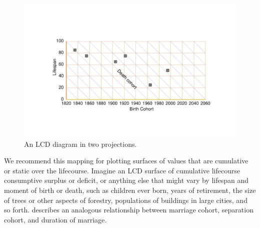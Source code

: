 \documentclass[12pt,oneside,a4paper]{article} %
\begin{document}
\begin{figure}[h!] 
\caption{An LCD diagram in two projections.}
\label{fig:LCD}
\centering
\vspace{-5em}
\includegraphics[scale=0.8]{Figures/LCDrt.pdf}
\end{figure} 

We
recommend this mapping for plotting surfaces of values that are cumulative or
static over the lifecourse. Imagine an LCD surface of cumulative lifecourse
consumptive surplus or deficit, or anything else that might vary by lifespan and
moment of birth or death, such as children ever born, years of retirement, the
size of trees or other aspects of forestry, populations of buildings in large
cities, and so forth. \citet{lexis1875einleitung} describes an analogous
relationship between marriage cohort, separation cohort, and duration of
marriage.
\end{document}
